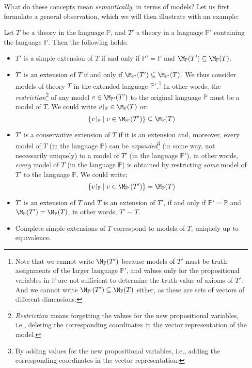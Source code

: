 What do these concepts mean \emph{semantically}, in terms of models? Let us first formulate a general observation, which we will then illustrate with an example:
\begin{observation}\label{observation:extensions-semantic-description-propositional}
    Let $T$ be a theory in the language $\mathbb P$, and $T'$ a theory in a language $\mathbb P'$ containing the language $\mathbb P$. Then the following holds:
    \begin{itemize}
        \item $T'$ is a simple extension of $T$ if and only if $\mathbb P' = \mathbb P$ and $\M_\mathbb P(T') \subseteq \M_\mathbb P(T)$,
        \item $T'$ is an extension of $T$ if and only if $\M_{\mathbb P'}(T') \subseteq \M_{\mathbb P'}(T)$. We thus consider models of theory $T$ in the extended language $\mathbb P'$.\footnote{Note that we cannot write $\M_\mathbb P(T')$ because models of $T'$ must be truth assignments of the larger language $\mathbb P'$, and values only for the propositional variables in $\mathbb P$ are not sufficient to determine the truth value of axioms of $T'$. And we cannot write $\M_{\mathbb P'}(T') \subseteq \M_{\mathbb P}(T)$ either, as these are sets of vectors of different dimensions.} In other words, the \emph{restriction}\footnote{\emph{Restriction} means forgetting the values for the new propositional variables, i.e., deleting the corresponding coordinates in the vector representation of the model.} of any model $v \in \M_{\mathbb P'}(T')$ to the original language $\mathbb P$ must be a model of $T$. We could write $v{\restriction_\mathbb P} \in \M_\mathbb P(T)$ or:
        $$
        \{v{\restriction_\mathbb P} \mid v \in \M_{\mathbb P'}(T')\} \subseteq \M_\mathbb P(T)
        $$
        \item $T'$ is a conservative extension of $T$ if it is an extension and, moreover, every model of $T$ (in the language $\mathbb P$) can be \emph{expanded}\footnote{By adding values for the new propositional variables, i.e., adding the corresponding coordinates in the vector representation.}  (in some way, not necessarily uniquely) to a model of $T'$ (in the language $\mathbb P'$), in other words, \emph{every} model of $T$ (in the language $\mathbb P$) is obtained by restricting \emph{some} model of $T'$ to the language $\mathbb P$. We could write:
        $$
        \{v{\restriction_\mathbb P} \mid v \in \M_{\mathbb P'}(T')\} = \M_\mathbb P(T)
        $$
        \item $T'$ is an extension of $T$ and $T$ is an extension of $T'$, if and only if $\mathbb P' = \mathbb P$ and $\M_\mathbb P(T') = \M_\mathbb P(T)$, in other words, $T' \sim T$.
        \item Complete simple extensions of $T$ correspond to models of $T$, uniquely up to equivalence.
    \end{itemize}
\end{observation}

